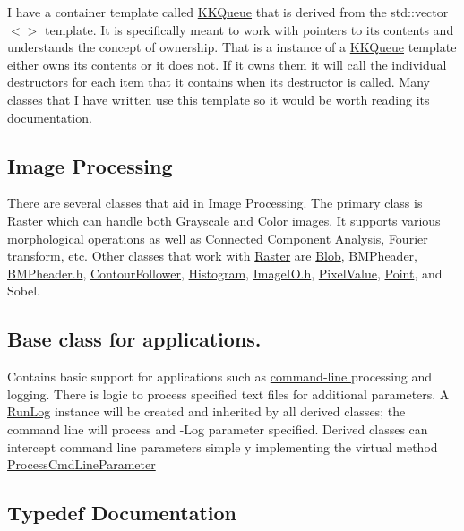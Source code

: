 I have a container template called \hyperlink{class_k_k_b_1_1_k_k_queue}{K\+K\+Queue} that is derived from the std\+::vector$<$$>$ template. It is specifically meant to work with pointers to its contents and understands the concept of ownership. That is a instance of a \hyperlink{class_k_k_b_1_1_k_k_queue}{K\+K\+Queue} template either owns its contents or it does not. If it owns them it will call the individual destructors for each item that it contains when its destructor is called. Many classes that I have written use this template so it would be worth reading its documentation. ~\newline
 \hypertarget{namespace_k_k_b_ImageProcessing}{}\subsection{Image Processing}\label{namespace_k_k_b_ImageProcessing}
There are several classes that aid in Image Processing. The primary class is \hyperlink{class_k_k_b_1_1_raster}{Raster} which can handle both Grayscale and Color images. It supports various morphological operations as well as Connected Component Analysis, Fourier transform, etc. Other classes that work with \hyperlink{class_k_k_b_1_1_raster}{Raster} are \hyperlink{class_k_k_b_1_1_blob}{Blob}, B\+M\+Pheader, \hyperlink{_b_m_pheader_8h}{B\+M\+Pheader.\+h}, \hyperlink{class_k_k_b_1_1_contour_follower}{Contour\+Follower}, \hyperlink{class_k_k_b_1_1_histogram}{Histogram}, \hyperlink{_image_i_o_8h}{Image\+I\+O.\+h}, \hyperlink{class_k_k_b_1_1_pixel_value}{Pixel\+Value}, \hyperlink{class_k_k_b_1_1_point}{Point}, and Sobel.\hypertarget{namespace_k_k_b_Application}{}\subsection{Base class for applications.}\label{namespace_k_k_b_Application}
Contains basic support for applications such as \hyperlink{class_k_k_b_1_1_cmd_line_expander}{command-\/line } processing and logging. There is logic to process specified text files for additional parameters. A \hyperlink{class_k_k_b_1_1_run_log}{Run\+Log} instance will be created and inherited by all derived classes; the command line will process and -\/\+Log parameter specified. Derived classes can intercept command line parameters simple y implementing the virtual method \hyperlink{class_k_k_b_1_1_application_a80260251934fab49820d28e4c6b5cff9}{Process\+Cmd\+Line\+Parameter } 

\subsection{Typedef Documentation}
